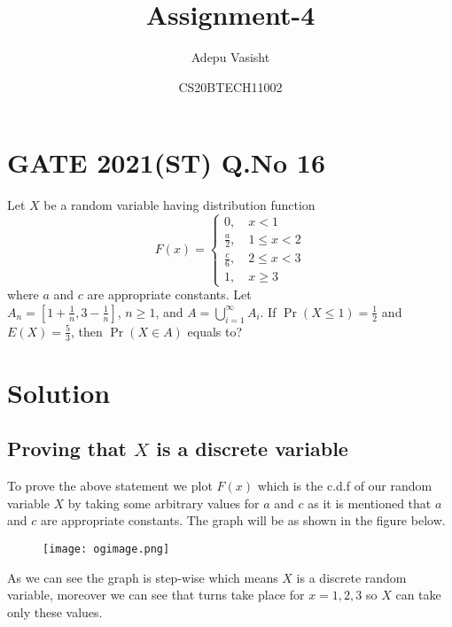\documentclass[journal,12pt,twocolumn]{IEEEtran}
\title{Assignment-4}
\author{Adepu Vasisht}
\date{CS20BTECH11002}
\providecommand{\brak}[1]{\ensuremath{\left(#1\right)}}
\begin{document}
\maketitle
\section*{GATE 2021(ST) Q.No 16}
Let $X$ be a random variable having distribution function 
\begin{equation}
\nonumber F(x)=
\begin{cases}
0, \quad x<1\\
\frac{a}{2}, \quad  1\leq x<2\\
\frac{c}{6}, \quad 2\leq x<3\\
1, \quad x\geq3
\end{cases}
\end{equation}
where $a$ and $c$ are appropriate constants. Let\\$A_n = \left[1+\frac{1}{n},3-\frac{1}{n}\right]$, $n\geq1$, and $A = \bigcup_{i=1}^{\infty}A_i$. If $\Pr\brak{X\leq1} = \frac{1}{2}$ and $E\brak{X} = \frac{5}{3}$, then $\Pr\brak{X\in A}$ equals to?

\section*{Solution}
\subsection{Proving that $X$ is a discrete variable}
To prove the above statement we plot $F\brak{x}$ which is the c.d.f of our random variable $X$ by taking some arbitrary values for $a$ and $c$ as it is mentioned that $a$ and $c$ are appropriate constants. The graph will be as shown in the figure below. 


\begin{figure}[h]
\texttt{[image: ogimage.png]}
\end{figure}

As we can see the graph is step-wise which means $X$ is a discrete random variable, moreover we can see that turns take place for $x=1,2,3$ so $X$ can take only these values.
\end{document}
